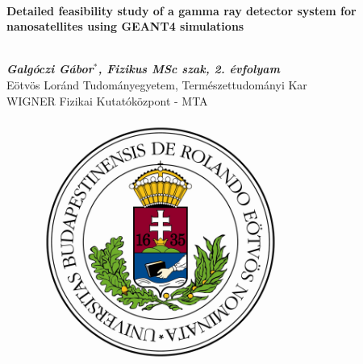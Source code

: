 \documentclass[12pt, a4paper,titlepage]{article}
\numberwithin{equation}{section}
\numberwithin{figure}{section}
\begin{document}
\begin{titlepage}

\begin{center}
\ \\

\vspace{1 cm}
\begin{large}\textbf{Detailed feasibility study of a gamma ray detector system for nanosatellites using GEANT4 simulations}\end{large}\\
\vspace{1 cm}
\textit{\textbf{Galgóczi Gábor$^{*}$, Fizikus MSc szak, 2. évfolyam}}\\
Eötvös Loránd Tudományegyetem, Természettudományi Kar\\
WIGNER Fizikai Kutatóközpont - MTA\\
\vspace{1.5cm}


\begin{figure}[H]
\centering


\includegraphics[width=80.0mm]{images/elte.png}  
\end{figure}






\end{center}
\end{titlepage}
\end{document}

